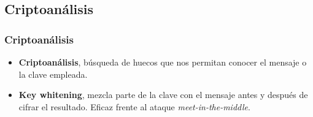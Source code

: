 \documentclass{beamer}
\begin{document}
	\subsection{Criptoanálisis}
	\begin{frame}
	\frametitle{Criptoanálisis}
	\begin{itemize}
		\item \textbf{Criptoanálisis}, búsqueda de huecos que nos permitan conocer el mensaje o la clave empleada.
	
		
		\item \textbf{Key whitening}, mezcla parte de la clave con el mensaje antes y después de cifrar el resultado. Eficaz frente al ataque \textit{meet-in-the-middle}.
	\end{itemize}
	\end{frame}
\end{document}
